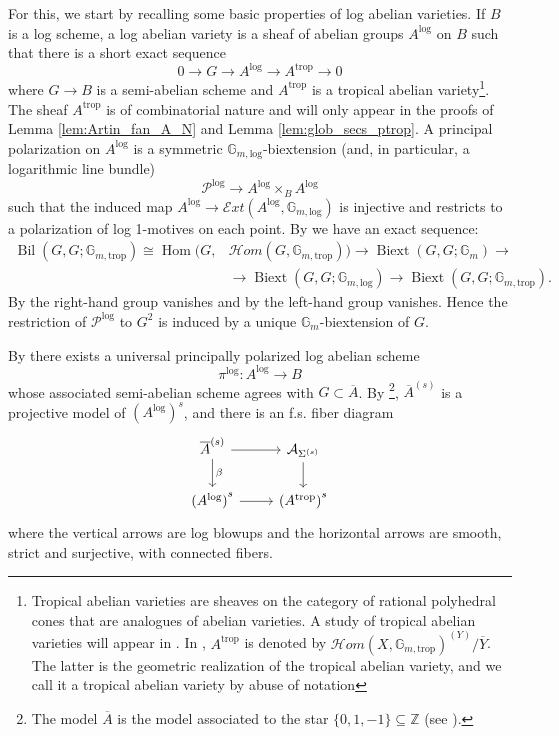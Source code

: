 \documentclass[11pt]{article}
\def\A{\mathcal{A}}
\def\P{\mathcal{P}}
\def\hom{\mathcal{H}om}
\DeclareMathOperator{\Hom}{Hom}
\def\Gm{\mathbb{G}_m}
\def\Glog{\mathbb{G}_{m,\log}}
\newcommand{\trop}{\mathrm{trop}}
\renewcommand{\log}{\mathrm{log}}
\newcommand{\barA}{\overline{A}}
\newcommand{\logA}{{A^{\log}}}
\newcommand{\ext}{\mathcal{E}xt}
\theoremstyle{definition}
\begin{document}
For this, we start by recalling some basic properties of log abelian varieties.
If $B$ is a log scheme, a log abelian variety is a sheaf of abelian groups
$A^{\log}$ on $B$ such that there is a short exact sequence
$$
0 \longrightarrow G \longrightarrow A^{\log} \longrightarrow A^{\trop} \longrightarrow 0
$$
where $G\to B$ is a semi-abelian scheme and $A^{\trop}$ is a tropical abelian variety\footnote{Tropical abelian varieties are sheaves on the category of rational polyhedral cones that are analogues of abelian varieties. A study of tropical abelian varieties will appear in \cite{troAV}. In \cite{KKN2}, $A^{\trop}$ is denoted by $\hom (X, \mathbb G_{m,\trop})^{(Y)}/\overline{Y}$. The latter is the geometric realization of the tropical abelian variety, and we call it a tropical abelian variety by abuse of notation}.
The sheaf $A^{\trop}$ is of combinatorial nature and will only appear in the proofs of Lemma \ref{lem:Artin_fan_A_N}
and Lemma \ref{lem:glob_secs_ptrop}.
A principal polarization on $A^{\log}$ is a symmetric $\Glog$-biextension (and, in particular, a logarithmic line bundle)
$$
\P^{\log} \to A^{\log}\times_B A^{\log}
$$
such that the induced map $A^{\log} \to \ext (A^{\log}, \Glog)$ is injective and restricts to a polarization of log 1-motives on each point.
By \cite[2.5.4.1 and 3.7.5]{grothendieck1973groupes} we have an exact sequence:
\begin{align*}
	\operatorname{Bil}(G,G;\mathbb{G}_{m,\trop})\cong \Hom(G,&\hom(G,\mathbb{G}_{m,\trop}))\to \operatorname{Biext}(G,G;\mathbb{G}_m)\to\\
	&\to \operatorname{Biext}(G,G;\mathbb{G}_{m,\log})\to \operatorname{Biext}(G,G;\mathbb{G}_{m,\trop}).
\end{align*}
By \cite[Proposition 1.6 (1)]{KKN5} the right-hand group vanishes
and by \cite[Lemma 6.1.1]{KKN2} the left-hand group vanishes.
Hence the restriction of $\P^{\log}$ to $G^2$ is induced by a unique $\Gm$-biextension of $G$.

By \cite[Theorem 1.8]{KKN7} there exists a universal principally polarized log abelian scheme
\[
\pi^{\log}: \logA\to B
\]
whose associated semi-abelian scheme agrees with $G \subset \barA$.
By \cite[Theorem 9.1]{KKN5}\footnote{The model $\barA$ is the model associated to the star $\{0,1,-1\}\subseteq \mathbb{Z}$ (see \cite[4.6]{KKN5}).}, $\barA^{(s)}$ is a projective model of $(\logA)^s$, and there is an f.s. fiber diagram
\begin{equation}
\begin{tikzcd}
	\barA^{(s)} & {\A_{\Sigma^{(s)}}} \\
	{(\logA)}^{s} & {(A^{\trop})}^{s}
	\arrow[from=1-1, to=1-2]
	\arrow[from=1-1, to=2-1,"\beta"]
	\arrow[from=1-2, to=2-2]
	\arrow[from=2-1, to=2-2]
\end{tikzcd}
\end{equation}
where the vertical arrows are log blowups and the horizontal arrows are smooth, strict and surjective, with connected fibers.
\end{document}
